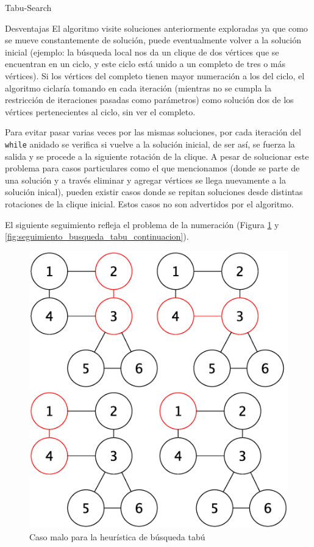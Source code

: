 \begin{section}{Tabu-Search}
\begin{subsection}{Desventajas}
		El algoritmo visite soluciones anteriormente exploradas ya que como se mueve constantemente de solución, puede eventualmente volver a la solución inicial (ejemplo: la búsqueda local nos da un clique de dos vértices que se encuentran en un ciclo, y este ciclo está unido a un completo de tres o más vértices). Si los vértices del completo tienen mayor numeración a los del ciclo, el algoritmo ciclaría tomando en cada iteración (mientras no se cumpla la restricción de iteraciones pasadas como parámetros) como solución dos de los vértices pertenecientes al ciclo, sin ver el completo.

		Para evitar pasar varias veces por las mismas soluciones, por cada iteración del \texttt{while} anidado se verifica si vuelve a la solución inicial, de ser así, se fuerza la salida y se procede a la siguiente rotación de la clique.
		A pesar de solucionar este problema para casos particulares como el que mencionamos (donde se parte de una solución y a través eliminar y agregar vértices se llega nuevamente a la solución inical), pueden existir casos donde se repitan soluciones desde distintas rotaciones de la clique inicial. Estos casos no son advertidos por el algoritmo.

		El siguiente seguimiento refleja el problema de la numeración (Figura \ref{fig:seguimiento_busqueda_tabu} y \ref{fig:seguimiento_busqueda_tabu_continuacion}).

			\begin{figure}[H]
				\centering
		    	\includegraphics[scale=0.5]{tabu_search/segCasoMalo.eps}
			    \caption{Caso malo para la heurística de búsqueda tabú}
			    \label{fig:seguimiento_busqueda_tabu}
			\end{figure}


\end{subsection}
\end{section}
